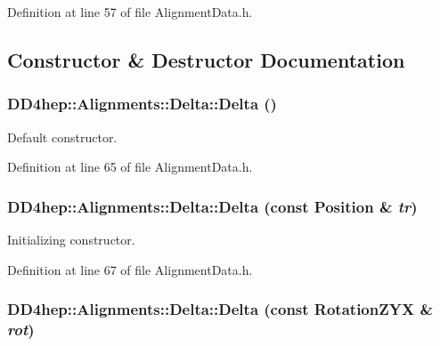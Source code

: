 Definition at line 57 of file AlignmentData.h.

\subsection{Constructor \& Destructor Documentation}
\hypertarget{class_d_d4hep_1_1_alignments_1_1_delta_a1db2d4fa836434f834b0bd0502bc43d7}{
\subsubsection[{Delta}]{\setlength{\rightskip}{0pt plus 5cm}DD4hep::Alignments::Delta::Delta ()}}
\label{class_d_d4hep_1_1_alignments_1_1_delta_a1db2d4fa836434f834b0bd0502bc43d7}


Default constructor. 

Definition at line 65 of file AlignmentData.h.\hypertarget{class_d_d4hep_1_1_alignments_1_1_delta_a4da265200c1c24051c8861dd7f5d09f2}{
\subsubsection[{Delta}]{\setlength{\rightskip}{0pt plus 5cm}DD4hep::Alignments::Delta::Delta (const Position \& {\em tr})}}
\label{class_d_d4hep_1_1_alignments_1_1_delta_a4da265200c1c24051c8861dd7f5d09f2}


Initializing constructor. 

Definition at line 67 of file AlignmentData.h.\hypertarget{class_d_d4hep_1_1_alignments_1_1_delta_ae692692779f93fe44ddcf501e1e4cdcd}{
\subsubsection[{Delta}]{\setlength{\rightskip}{0pt plus 5cm}DD4hep::Alignments::Delta::Delta (const RotationZYX \& {\em rot})}}
\label{class_d_d4hep_1_1_alignments_1_1_delta_ae692692779f93fe44ddcf501e1e4cdcd}


